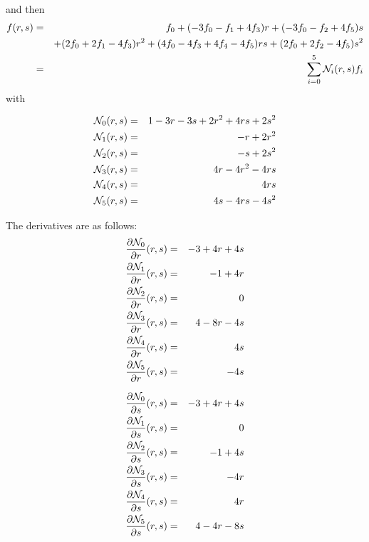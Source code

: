 and then
\begin{eqnarray}
f(r,s) 
&=& f_0 + (-3f_0-f_1+4f_3) r + (-3f_0-f_2+4f_5)s \nonumber\\
&& +(2f_0+2f_1-4f_3)r^2 + (4f_0-4f_3+4f_4-4f_5) rs + (2f_0+2f_2-4f_5)s^2 \nonumber\\
&=& \sum_{i=0}^5 {\mathcal{N}}_i(r,s) f_i
\end{eqnarray}
with
\begin{mdframed}[backgroundcolor=blue!5]
\begin{eqnarray}
{\mathcal{N}}_0(r,s) &=& 1-3r-3s+2r^2+4rs+2s^2 \nonumber\\
{\mathcal{N}}_1(r,s) &=& -r+2r^2 \nonumber\\
{\mathcal{N}}_2(r,s) &=& -s+2s^2 \nonumber\\
{\mathcal{N}}_3(r,s) &=& 4r-4r^2-4rs \nonumber\\
{\mathcal{N}}_4(r,s) &=& 4rs \nonumber\\
{\mathcal{N}}_5(r,s) &=& 4s-4rs-4s^2 \nonumber
\end{eqnarray}
\end{mdframed}

The derivatives are as follows:
\begin{eqnarray}
\frac{\partial {\mathcal{N}}_0}{\partial r}(r,s) &=&  -3+4r+4s \nonumber\\ 
\frac{\partial {\mathcal{N}}_1}{\partial r}(r,s) &=&  -1+4r\nonumber\\ 
\frac{\partial {\mathcal{N}}_2}{\partial r}(r,s) &=&  0\nonumber\\ 
\frac{\partial {\mathcal{N}}_3}{\partial r}(r,s) &=&  4-8r-4s\nonumber\\ 
\frac{\partial {\mathcal{N}}_4}{\partial r}(r,s) &=&  4s\nonumber\\ 
\frac{\partial {\mathcal{N}}_5}{\partial r}(r,s) &=&  -4s\nonumber
\end{eqnarray}

\begin{eqnarray}
\frac{\partial {\mathcal{N}}_0}{\partial s}(r,s) &=&  -3+4r+4s\nonumber\\ 
\frac{\partial {\mathcal{N}}_1}{\partial s}(r,s) &=&  0\nonumber\\ 
\frac{\partial {\mathcal{N}}_2}{\partial s}(r,s) &=&  -1+4s\nonumber\\ 
\frac{\partial {\mathcal{N}}_3}{\partial s}(r,s) &=&  -4r\nonumber\\ 
\frac{\partial {\mathcal{N}}_4}{\partial s}(r,s) &=&  4r\nonumber\\ 
\frac{\partial {\mathcal{N}}_5}{\partial s}(r,s) &=&  4-4r-8s\nonumber
\end{eqnarray}
